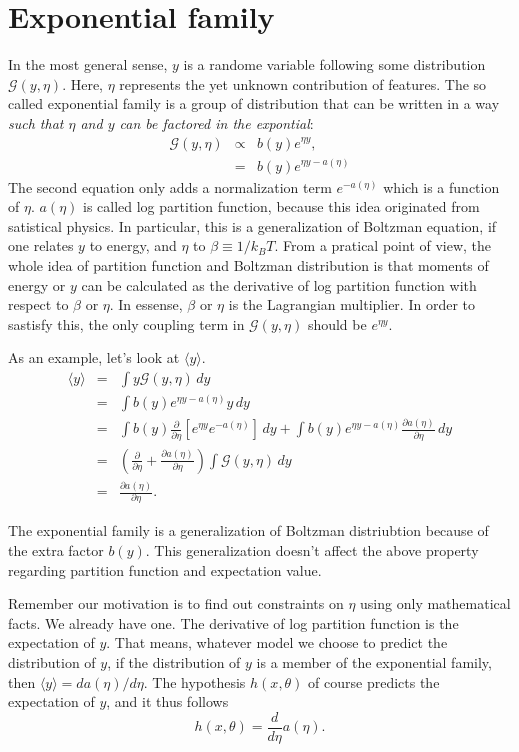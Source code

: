 \section{Exponential family}
In the most general sense, $y$ is a randome variable following some distribution $\mathcal G(y, \eta)$. Here, $\eta$ represents the yet unknown contribution of features. The so called exponential family is a group of distribution that can be written in a way \emph{such that $\eta$ and $y$ can be factored in the expontial}:
\begin{eqnarray}
	\mathcal G(y, \eta) &\propto& b(y)e^{\eta y},\\
			 &=& b(y)e^{\eta y - a(\eta)}\label{eqn:exponential-family}
\end{eqnarray}
The second equation only adds a normalization term $e^{-a(\eta)}$ which is a function of $\eta$. $a(\eta)$ is called log partition function, because this idea originated from satistical physics. In particular, this is a generalization of Boltzman equation, if one relates $y$ to energy, and $\eta$ to $\beta\equiv 1/k_BT$. From a pratical point of view, the whole idea of partition function and Boltzman distribution is that moments of energy or $y$ can be calculated as the derivative of log partition function with respect to $\beta$ or $\eta$. In essense, $\beta$ or $\eta$ is the Lagrangian multiplier. In order to sastisfy this, the only coupling term in $\mathcal G(y, \eta)$ should be $e^{\eta y}$.

As an example, let's look at $\langle y\rangle$.
\begin{eqnarray}
	\langle y\rangle &=&\int y\mathcal G(y, \eta)\, dy\\
		   &=&\int b(y)e^{\eta y -a(\eta)}y\,dy\\
     &=&\int b(y)\frac{\partial}{\partial\eta}\left[e^{\eta y}e^{-a(\eta)}\right]\,dy + \int b(y)e^{\eta y-a(\eta)}\frac{\partial a(\eta)}{\partial\eta}\,dy\\
	&=&(\frac{\partial}{\partial\eta}+ \frac{\partial a(\eta)}{\partial\eta})\int \mathcal G(y, \eta)\, dy\\
	&=&\frac{\partial a(\eta)}{\partial\eta}.
\end{eqnarray}

The exponential family is a generalization of Boltzman distriubtion because of the extra factor $b(y)$. This generalization doesn't affect the above property regarding partition function and expectation value.

Remember our motivation is to find out constraints on $\eta$ using only mathematical facts. We already have one. The derivative of log partition function is the expectation of $y$. That means, whatever model we choose to predict the distribution of $y$, if the distribution of $y$ is a member of the exponential family, then $\langle y\rangle=da(\eta)/d\eta$. The hypothesis $h(x, \theta)$ of course predicts the expectation of $y$, and it thus follows
\begin{equation}
	h(x, \theta) = \frac{d}{d\eta}a(\eta). \label{eqn:exponential_hypo}
\end{equation}


